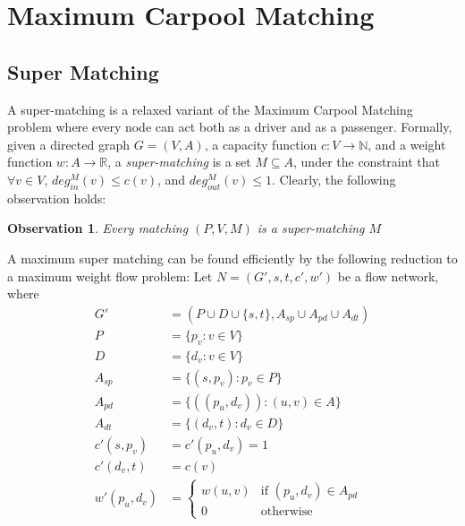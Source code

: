 \documentclass[draft]{article}
\def\R{\mathbb{R}}
\def\N{\mathbb{N}}
\newtheorem{observation}{Observation}
\newcommand{\din}[1][M]{deg^M_{in}}
\newcommand{\dout}[1][M]{deg^M_{out}}
\def\CARPOOL{Maximum Carpool Ma\-tching}
\begin{document}
\section{\CARPOOL{}}
\label{sec:cm}
	\subsection{Super Matching}
A super-matching is a relaxed variant of the \CARPOOL{} problem 
where every node can act both as a driver and as a passenger. 
Formally, given a directed graph $G = (V, A)$, 
a capacity function $ c: V \rightarrow \N $,
and a weight function $w : A \rightarrow \R$,
a \emph{super-matching} is a set $M \subseteq A$, 
under the constraint that $\forall v \in V$,
$\din(v) \leq c(v)$, and $\dout(v) \leq 1$. 
%
Clearly, the following observation holds:
\begin{observation}
\label{ob:matching is super}
Every matching $(P, V, M)$ is a super-matching $M$
\end{observation}

A maximum super matching can be found efficiently by the following reduction 
to a maximum weight flow problem: 
Let $N = (G', s, t, c', w')$ be a flow network, where 
\begin{align*}
G'				& = (P \cup D \cup \{s, t\}, A_{sp} \cup A_{pd} \cup A_{dt})	\\
P				& = \{p_v : v \in V\}					\\
D				& = \{d_v : v \in V\}					\\
A_{sp}			& = \{ (s, p_v) : p_v \in P \}			\\
A_{pd}			& = \{ ((p_u, d_v)) : (u, v) \in A \}	\\
A_{dt}			& = \{ (d_v, t) : d_v \in D \}			\\
c'(s, p_v)		& = c'(p_u, d_v) = 1					\\
c'(d_v, t)		& = c(v)								\\
w'(p_u, d_v)	& = 
\begin{cases}
w(u, v) & \text{if } (p_u, d_v) \in A_{pd} \\
0 & \text{otherwise}	
\end{cases}
\end{align*}
\end{document}
